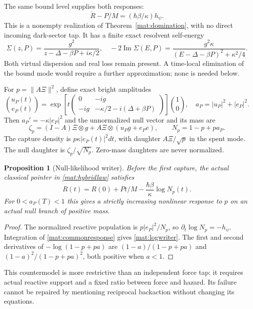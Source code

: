 \documentclass[11pt,oneside,openany]{book}
\newtheorem{proposition}[theorem]{Proposition}
\theoremstyle{definition}
\theoremstyle{remark}\newtheorem{remark}[theorem]{Remark}
\begin{document}
The same bound level supplies both responses:
\begin{equation}
 \dot R-P/M=(\hbar\beta/\kappa)h_\psi.
 \label{mat:commonresponse}
\end{equation}
This is a nonempty realization of Theorem~\ref{mat:domination}, with no direct incoming dark-sector tap. It has a finite exact resolvent self-energy
\[
 \Sigma(z,P)=\frac{g^2}{z-\Delta-\beta P+i\kappa/2},
 \quad -2\operatorname{Im}\Sigma(E,P)
   =\frac{g^2\kappa}{(E-\Delta-\beta P)^2+\kappa^2/4}.
\]
Both virtual dispersion and real loss remain present. A time-local elimination of the bound mode would require a further approximation; none is needed below.

For $p=\|A\Xi\|^2$, define exact bright amplitudes
\begin{equation}
 \binom{u_P(t)}{e_P(t)}=
 \exp\left[t\begin{pmatrix}0&-ig\\-ig&-\kappa/2-i(\Delta+\beta P)\end{pmatrix}\right]
 \binom10,
 \quad a_P=|u_P|^2+|e_P|^2.
 \label{mat:bright}
\end{equation}
Then $a_P'=-\kappa|e_P|^2$ and the unnormalized null vector and its mass are
\[
 \zeta_p=(I-A)\Xi\otimes g+A\Xi\otimes(u_Pg+e_Pe),
 \qquad N_p=1-p+pa_P.
\]
The capture density is $p\kappa|e_P(t)|^2dt$, with daughter $A\Xi/\sqrt p$ in the spent mode. The null daughter is $\zeta_p/\sqrt{N_p}$. Zero-mass daughters are never normalized.

\begin{proposition}[Null-likelihood writer]
\label{mat:nullwriter}
Before the first capture, the actual classical pointer in \eqref{mat:hybridlaw} satisfies
\begin{equation}
 R(t)=R(0)+Pt/M-\frac{\hbar\beta}{\kappa}\log N_p(t).
 \label{mat:logwriter}
\end{equation}
For $0<a_P(T)<1$ this gives a strictly increasing nonlinear response to $p$ on an actual null branch of positive mass.
\end{proposition}
\begin{proof}
The normalized reactive population is $p|e_P|^2/N_p$, so
$\partial_t\log N_p=-h_\psi$. Integration of \eqref{mat:commonresponse} gives \eqref{mat:logwriter}. The first and second derivatives of $-\log(1-p+pa)$ are $(1-a)/(1-p+pa)$ and $(1-a)^2/(1-p+pa)^2$, both positive when $a<1$.
\end{proof}

This countermodel is more restrictive than an independent force tap: it requires actual reactive support and a fixed ratio between force and hazard. Its failure cannot be repaired by mentioning reciprocal backaction without changing its equations.
\end{document}
